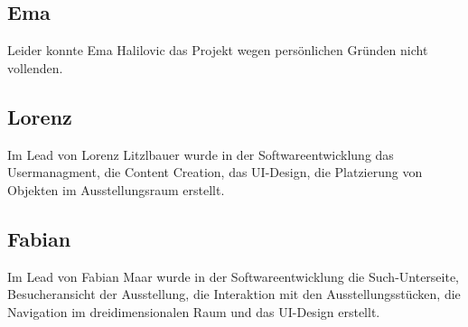 \subsection{Ema}
Leider konnte Ema Halilovic das Projekt wegen persönlichen Gründen nicht vollenden. 
\subsection{Lorenz}
Im Lead von Lorenz Litzlbauer wurde in der Softwareentwicklung das 
Usermanagment, 
die Content Creation, 
das UI-Design, die Platzierung von Objekten im Ausstellungsraum erstellt.

\subsection{Fabian}
Im Lead von Fabian Maar wurde in der Softwareentwicklung die Such-Unterseite, Besucheransicht der Ausstellung, die Interaktion mit den Ausstellungsstücken, die Navigation im dreidimensionalen Raum und das UI-Design erstellt.
	
